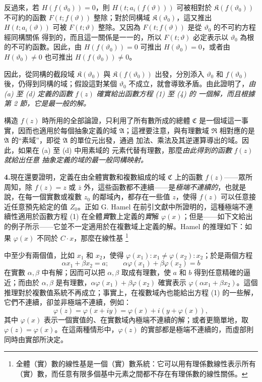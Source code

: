 \documentclass[11pt]{article}
\providecommand{\qtext}[1]{“#1”}
\providecommand{\Afield}{\mathfrak A}
\providecommand{\Cfield}{\mathfrak C}
\providecommand{\Kfield}{\mathfrak K}
\providecommand{\Rfield}{\mathfrak R}
\providecommand{\srcfn}[2]{%
  \begingroup\renewcommand{\thefootnote}{#1}\footnote{#2}\addtocounter{footnote}{-1}\endgroup}
\begin{document}
反過來，若 \(H(f(\vartheta_0))=0\)，則
\(H(t;a_i(f(\vartheta)))\) 可被相對於
\(\Kfield(f(\vartheta_0))\) 不可約的函數
\(F(t;f(\vartheta))\) 整除；對於同構域
\(\Kfield(\vartheta_0)\)，這又推出
\(H(t;a_i(\vartheta))\) 可被 \(F(t;\vartheta)\) 整除。又因為
\(F(t;f(\vartheta))\) 是從 \(\vartheta_0\) 的不可約方程經同構關係
得到的，而且這一關係是一一的，所以 \(F(t;\vartheta)\) 必定表示以
\(\vartheta_0\) 為根的不可約函數。因此，由
\(H(f(\vartheta_0))=0\) 可推出 \(H(\vartheta_0)=0\)，或者由
\(H(\vartheta_0)\ne0\) 也可推出 \(H(f(\vartheta_0))\ne0\)。

因此，從同構的截段域 \(\Kfield(\vartheta_0)\) 與
\(\Kfield(f(\vartheta_0))\) 出發，分別添入 \(\vartheta_0\) 和
\(f(\vartheta_0)\) 後，仍得到同構的域；假設這對某個
\(\vartheta_0\) 不成立，就會導致矛盾。由此證明了，\emph{由 (a) 至
(d) 定義的函數} \(f(z)\) \emph{確實給出函數方程 (1) 至 (4) 的
一個解，而且根據第 2 節，它是最一般的解。}

構造 \(f(z)\) 時所用的全部論證，只利用了所有數所成的總體
\(\Cfield\) 是一個域這一事實，因而也適用於每個抽象定義的域
\(\Afield\)；這裡要注意，與有理數域 \(\Rfield\) 相對應的是
\(\Afield\) 的\qtext{素域}，即從 \(\Afield\) 的單位元出發，通過
加法、乘法及其逆運算導出的域。因此，如果在 (a) 至 (d) 中用素域的
元素代替有理數，那麼\emph{由此得到的函數} \(f(z)\) \emph{就給出任意
抽象定義的域的最一般同構映射。}

\medskip

\noindent\textbf{4.}\quad 現在還要證明，定義在由全體實數和複數組成的域 \(\Cfield\) 上的函數 \(f(z)\)——眾所周知，除 \(f(z)=z\) 或 \(\overline z\) 外，這些函數都不連續——是\emph{極端不連續的}，也就是說，在每一個實數或複數 \(z_0\) 的鄰域內，都存在一些值 \(z\)，使得 \(f(z)\) 可以任意接近任意預先給定的值 \(Z_0\)。正如 G. Hamel 在前引文獻中所證明的，這種極端不連續性適用於函數方程 (1) 在全體\emph{實}數上定義的\emph{實}解 \(\varphi(x)\)；但是——如下文給出的例子所示——它並不一定適用於在複數域上定義的解。Hamel 的推理如下：如果 \(\varphi(x)\) 不同於 \(C\cdot x\)，那麼在線性基\srcfn{*)}{全體（實）數的線性基是一個（實）數系統：它可以用有理係數線性表示所有（實）數，而任意有限多個基中元素之間都不存在有理係數的線性關係。}中至少有兩個值，比如 \(x_1\) 和 \(x_2\)，使得 \(\varphi(x_1):x_1\ne\varphi(x_2):x_2\)；於是兩個方程
\[
\alpha x_1+\beta x_2=a;\qquad \alpha\varphi(x_1)+\beta\varphi(x_2)=b
\]
在實數 \(\alpha,\beta\) 中有解；因而可以把 \(\alpha,\beta\) 取成有理數，使 \(a\) 和 \(b\) 得到任意精確的逼近；而由於 \(\alpha,\beta\) 是有理數，\(\alpha\varphi(x_1)+\beta\varphi(x_2)\) 確實表示 \(\varphi(\alpha x_1+\beta x_2)\)。這個推理對於複數值系統不再成立；事實上，在複數域內也能給出方程 (1) 的一些解，它們不連續，卻並非極端不連續，例如：
\[
\varphi(z)=\varphi(x+iy)=\varphi(x)+i(y+\varphi(x)),
\]
其中 \(\varphi(x)\) 表示一個實值的、在實數域內極端不連續的解；或者更簡單地，取 \(\varphi(z)=\varphi(x)\)。在這兩種情形中，\(\varphi(z)\) 的實部都是極端不連續的，而虛部則同時由實部所決定。
\end{document}
